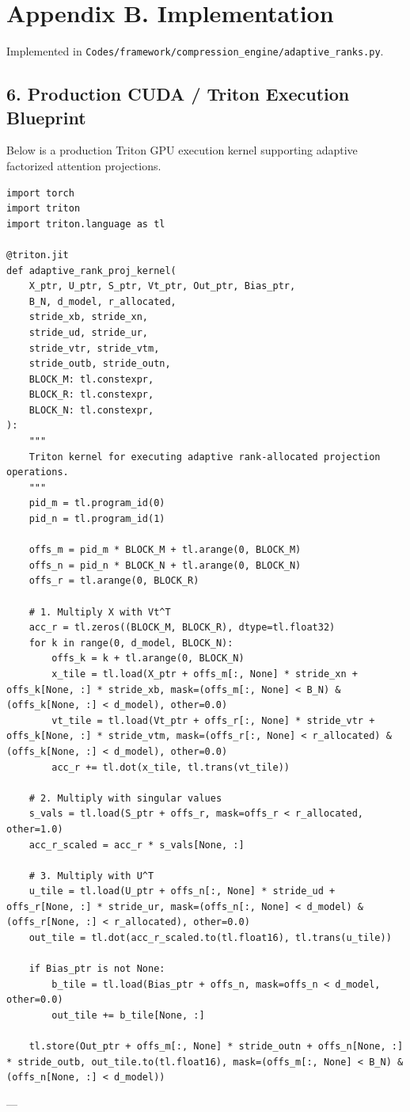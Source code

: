 \section*{Appendix B. Implementation}Implemented in \texttt{Codes/framework/compression\_engine/adaptive\_ranks.py}.



\subsection{6. Production CUDA / Triton Execution Blueprint}
Below is a production Triton GPU execution kernel supporting adaptive factorized attention projections.


\begin{lstlisting}
import torch
import triton
import triton.language as tl

@triton.jit
def adaptive_rank_proj_kernel(
    X_ptr, U_ptr, S_ptr, Vt_ptr, Out_ptr, Bias_ptr,
    B_N, d_model, r_allocated,
    stride_xb, stride_xn,
    stride_ud, stride_ur,
    stride_vtr, stride_vtm,
    stride_outb, stride_outn,
    BLOCK_M: tl.constexpr,
    BLOCK_R: tl.constexpr,
    BLOCK_N: tl.constexpr,
):
    """
    Triton kernel for executing adaptive rank-allocated projection operations.
    """
    pid_m = tl.program_id(0)
    pid_n = tl.program_id(1)

    offs_m = pid_m * BLOCK_M + tl.arange(0, BLOCK_M)
    offs_n = pid_n * BLOCK_N + tl.arange(0, BLOCK_N)
    offs_r = tl.arange(0, BLOCK_R)

    # 1. Multiply X with Vt^T
    acc_r = tl.zeros((BLOCK_M, BLOCK_R), dtype=tl.float32)
    for k in range(0, d_model, BLOCK_N):
        offs_k = k + tl.arange(0, BLOCK_N)
        x_tile = tl.load(X_ptr + offs_m[:, None] * stride_xn + offs_k[None, :] * stride_xb, mask=(offs_m[:, None] < B_N) & (offs_k[None, :] < d_model), other=0.0)
        vt_tile = tl.load(Vt_ptr + offs_r[:, None] * stride_vtr + offs_k[None, :] * stride_vtm, mask=(offs_r[:, None] < r_allocated) & (offs_k[None, :] < d_model), other=0.0)
        acc_r += tl.dot(x_tile, tl.trans(vt_tile))

    # 2. Multiply with singular values
    s_vals = tl.load(S_ptr + offs_r, mask=offs_r < r_allocated, other=1.0)
    acc_r_scaled = acc_r * s_vals[None, :]

    # 3. Multiply with U^T
    u_tile = tl.load(U_ptr + offs_n[:, None] * stride_ud + offs_r[None, :] * stride_ur, mask=(offs_n[:, None] < d_model) & (offs_r[None, :] < r_allocated), other=0.0)
    out_tile = tl.dot(acc_r_scaled.to(tl.float16), tl.trans(u_tile))

    if Bias_ptr is not None:
        b_tile = tl.load(Bias_ptr + offs_n, mask=offs_n < d_model, other=0.0)
        out_tile += b_tile[None, :]

    tl.store(Out_ptr + offs_m[:, None] * stride_outn + offs_n[None, :] * stride_outb, out_tile.to(tl.float16), mask=(offs_m[:, None] < B_N) & (offs_n[None, :] < d_model))
\end{lstlisting}


---